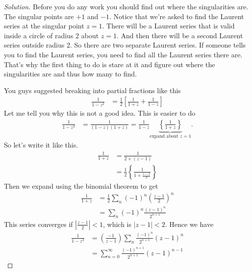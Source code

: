 \begin{proof}[Solution]
    Before you do any work you should find out where the singularities are.
    The singular points are $+1$ and $-1$.
    Notice that we're asked to find the Laurent series at the singular point
    $z=1$.
    There will be a Laurent series that is valid inside a circle of radius 2
    about $z=1$.
    And then there will be a second Laurent series outside radius 2.
    So there are two separate Laurent series.
    If someone tells you to find the Laurent series,
    you need to find all the Laurent series there are.
    That's why the first thing to do is stare at it and figure out where the
    singularities are and thus how many to find.

    You guys suggested breaking into partial fractions like this
    \begin{align}
        \frac{1}{1 - z^2}
        &=
        \frac{1}{2}\left[
            \frac{1}{1 + z}
            + \frac{1}{1 - z}
        \right]
    \end{align}
    Let me tell you why this is not a good idea.
    This is easier to do
    \begin{align}
        \frac{1}{1 - z^2}
        &= \frac{1}{(1 - z)(1 + z)}
        = \frac{1}{1 - z}
        \underbrace{\left\{ \frac{1}{1 + z} \right\}}_{
            \text{expand about }z=1
        }.
    \end{align}
    So let's write it like this.
    \begin{align}
        \frac{1}{1 + z}
        &= \frac{1}{2 + (z - 1)}\\
        &= \frac{1}{2}\left\{
            \frac{1}{1 + \frac{z - 1}{2}}
        \right\}
    \end{align}
    Then we expand using the binomial theorem to get
    \begin{align}
        \frac{1}{1 + z}
        &= \frac{1}{2}\sum_n (-1)^n
        \left(\frac{z - 1}{2} \right)^n\\
        &= \sum_n (-1)^n \frac{(z - 1)^n}{2^{n + 1}}
    \end{align}
    This series converges if $\left|\frac{z - 1}{2}\right| < 1$,
    which is $|z - 1|<2$.
    Hence we have
    \begin{align}
        \frac{1}{1 - z^2}
        &= \left(\frac{-1}{z - 1}\right)
        \sum_n
        \frac{(-1)^n}{2^{n + 1}}
        (z - 1)^n\\
        &= \sum_{n=0}^{\infty} \frac{(-1)^{n + 1}}{2^{n + 1}}
        (z - 1)^{n - 1}
    \end{align}

\end{proof}
